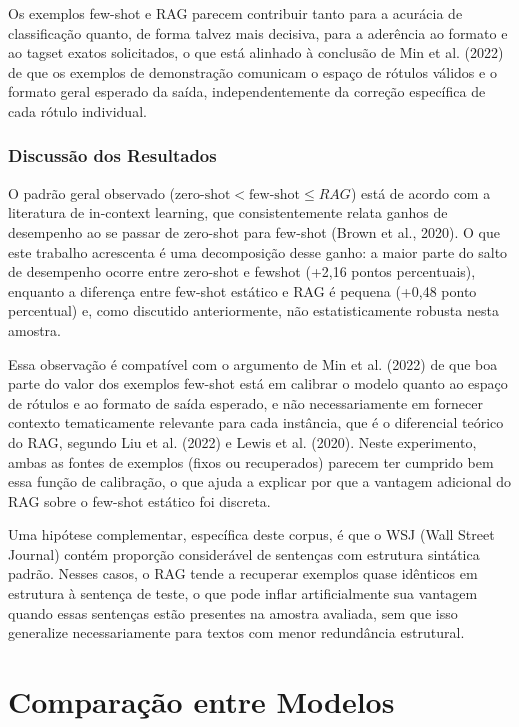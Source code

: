 \documentclass[a4paper,12pt]{article}
\begin{document}
Os exemplos few-shot e RAG parecem contribuir tanto para a acurácia de classificação quanto, de forma talvez mais decisiva, para a aderência ao formato e ao tagset exatos solicitados, o que está alinhado à conclusão de Min et al. (2022) de que os exemplos de demonstração comunicam o espaço de rótulos válidos e o formato geral esperado da saída, independentemente da correção específica de cada rótulo individual.

\subsubsection{Discussão dos Resultados}

O padrão geral observado ($\text{zero-shot} < \text{few-shot} \leq RAG$) está de acordo com a literatura de in-context learning, que consistentemente relata ganhos de desempenho ao se passar de zero-shot para few-shot (Brown et al., 2020). O que este trabalho acrescenta é uma decomposição desse ganho: a maior parte do salto de desempenho ocorre entre zero-shot e fewshot (+2,16 pontos percentuais), enquanto a diferença entre few-shot estático e RAG é pequena (+0,48 ponto percentual) e, como discutido anteriormente, não estatisticamente robusta nesta amostra.

Essa observação é compatível com o argumento de Min et al. (2022) de que boa parte do valor dos exemplos few-shot está em calibrar o modelo quanto ao espaço de rótulos e ao formato de saída esperado, e não necessariamente em fornecer contexto tematicamente relevante para cada instância, que é o diferencial teórico do RAG, segundo Liu et al. (2022) e Lewis et al. (2020). Neste experimento, ambas as fontes de exemplos (fixos ou recuperados) parecem ter cumprido bem essa função de calibração, o que ajuda a explicar por que a vantagem adicional do RAG sobre o few-shot estático foi discreta.

Uma hipótese complementar, específica deste corpus, é que o WSJ (Wall Street Journal) contém proporção considerável de sentenças com estrutura sintática padrão. Nesses casos, o RAG tende a recuperar exemplos quase idênticos em estrutura à sentença de teste, o que pode inflar artificialmente sua vantagem quando essas sentenças estão presentes na amostra avaliada, sem que isso generalize necessariamente para textos com menor redundância estrutural.


\section{Comparação entre Modelos}
\end{document}
